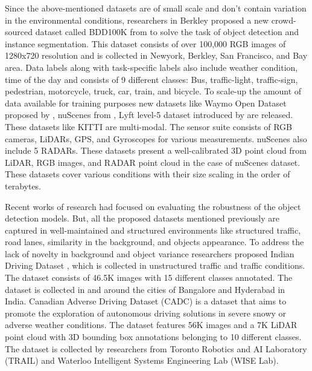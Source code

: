     Since the above-mentioned datasets are of small scale and don't contain variation in the environmental conditions, researchers in Berkley proposed a new crowd-sourced dataset called BDD100K from \citet{bdd100k} to solve the task of object detection and instance segmentation. This dataset consists of over 100,000 RGB images of 1280x720 resolution and is collected in Newyork, Berkley, San Francisco, and Bay area. Data labels along with task-specific labels also include weather condition, time of the day and consists of 9 different classes: Bus, traffic-light, traffic-sign, pedestrian, motorcycle, truck, car, train, and bicycle. To scale-up the amount of data available for training purposes new datasets like Waymo Open Dataset proposed by \citet{sun2020scalability}, nuScenes from \citet{nuscenes2019}, Lyft level-5 dataset introduced by \citet{l5dataset} are released. These datasets like KITTI \citet{KITTI2012} are multi-modal. The sensor suite consists of RGB cameras, LiDARs, GPS, and Gyroscopes for various measurements. nuScenes also include 5 RADARs. These datasets present a well-calibrated 3D point cloud from LiDAR, RGB images, and RADAR point cloud in the case of nuScenes dataset. These datasets cover various conditions with their size scaling in the order of terabytes.
    
    Recent works of research had focused on evaluating the robustness of the object detection models. But, all the proposed datasets mentioned previously are captured in well-maintained and structured environments like structured traffic, road lanes, similarity in the background, and objects appearance. To address the lack of novelty in background and object variance researchers proposed Indian Driving Dataset \citet{Varma2019IDDAD}, which is collected in unstructured traffic and traffic conditions.  The dataset consists of 46.5K images with 15 different classes annotated. The dataset is collected in and around the cities of Bangalore and Hyderabad in India. Canadian Adverse Driving Dataset (CADC) \citet{pitropov2020canadian} is a dataset that aims to promote the exploration of autonomous driving solutions in severe snowy or adverse weather conditions. The dataset features 56K images and a 7K LiDAR point cloud with 3D bounding box annotations belonging to 10 different classes. The dataset is collected by researchers from Toronto Robotics and AI Laboratory (TRAIL) and Waterloo Intelligent Systems Engineering Lab (WISE Lab).
    
